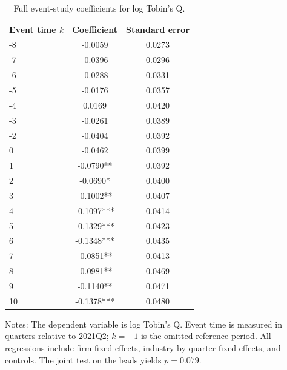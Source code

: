 \begin{table}[htbp]
\centering
\small
\caption{Full event-study coefficients for log Tobin's Q.}
\label{tab:event}
\begin{threeparttable}
\begin{tabular}{lcc}
\toprule
Event time $k$ & Coefficient & Standard error \\
\midrule
-8 & -0.0059 & 0.0273 \\
-7 & -0.0396 & 0.0296 \\
-6 & -0.0288 & 0.0331 \\
-5 & -0.0176 & 0.0357 \\
-4 & 0.0169 & 0.0420 \\
-3 & -0.0261 & 0.0389 \\
-2 & -0.0404 & 0.0392 \\
0 & -0.0462 & 0.0399 \\
1 & -0.0790** & 0.0392 \\
2 & -0.0690* & 0.0400 \\
3 & -0.1002** & 0.0407 \\
4 & -0.1097*** & 0.0414 \\
5 & -0.1329*** & 0.0423 \\
6 & -0.1348*** & 0.0435 \\
7 & -0.0851** & 0.0413 \\
8 & -0.0981** & 0.0469 \\
9 & -0.1140** & 0.0471 \\
10 & -0.1378*** & 0.0480 \\
\bottomrule
\end{tabular}
\begin{tablenotes}[flushleft]
\footnotesize
\item Notes: The dependent variable is log Tobin's Q. Event time is measured in quarters relative to 2021Q2; $k=-1$ is the omitted reference period. All regressions include firm fixed effects, industry-by-quarter fixed effects, and controls. The joint test on the leads yields $p=0.079$.
\end{tablenotes}
\end{threeparttable}
\end{table}
